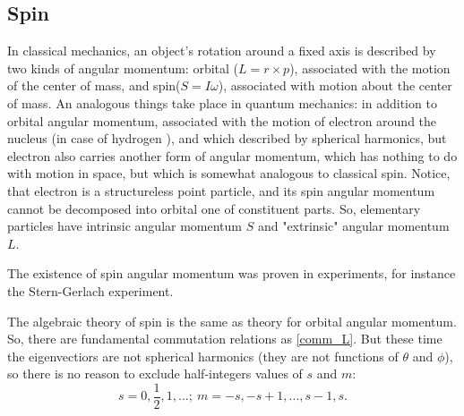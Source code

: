 \documentclass[a4paper, 12pt]{article}
\begin{document}



\subsection{Spin}
In classical mechanics, an object's rotation around a fixed axis  is described by two kinds of angular momentum: orbital ($L = r \times p$), associated with the motion of the center of mass, and spin($S = I \omega$), associated with motion about the center of mass. An analogous things take place in quantum mechanics: in addition to orbital angular momentum, associated with the motion of electron around the nucleus (in case of hydrogen ), and which  described by spherical harmonics, but electron also carries another form of angular momentum, which has nothing to do with motion in space, but which is somewhat analogous to classical spin. Notice, that electron is a structureless point particle, and its spin angular momentum cannot be decomposed into orbital one of constituent parts. So, elementary particles have intrinsic angular momentum $S$ and "extrinsic" angular momentum $L.$

The existence of spin angular momentum was proven in experiments, for instance the Stern-Gerlach experiment.


The algebraic  theory of spin is the same as theory for orbital angular momentum. So, there are fundamental commutation relations as \eqref{comm_L}.
But these time the eigenvectiors are not spherical harmonics (they are not functions of $\theta$ and $\phi$), so there is no reason to exclude half-integers values of $s$ and $m$:
$$s = 0, \frac{1}{2}, 1, ...;  ~ m = -s, -s+1,...,s-1, s. $$
\end{document}
